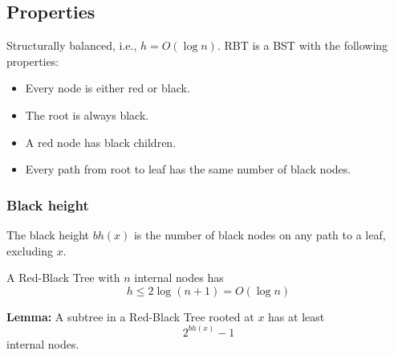 \subsection{Properties}
\begin{definition}
    Structurally balanced, i.e., \( h = O(\log n) \). RBT is a BST with the following properties:
    \begin{itemize}
        \item Every node is either red or black.
        \item The root is always black.
        \item A red node has black children.
        \item Every path from root to leaf has the same number of black nodes.
    \end{itemize}
\end{definition}

\subsubsection{Black height}
\begin{definition}
    The black height \( bh(x) \) is the number of black nodes on any path to a leaf, excluding \( x \).
\end{definition}

\begin{theorem}
    A Red-Black Tree with \( n \) internal nodes has 
    \begin{equation}
        h \leq 2 \log(n+1) = O(\log n)
    \end{equation}
\end{theorem}

\begin{theorem}
    \textbf{Lemma:} A subtree in a Red-Black Tree rooted at \( x \) has at least 
    \begin{equation}
        2^{bh(x)} - 1
    \end{equation}
    internal nodes.
\end{theorem}

